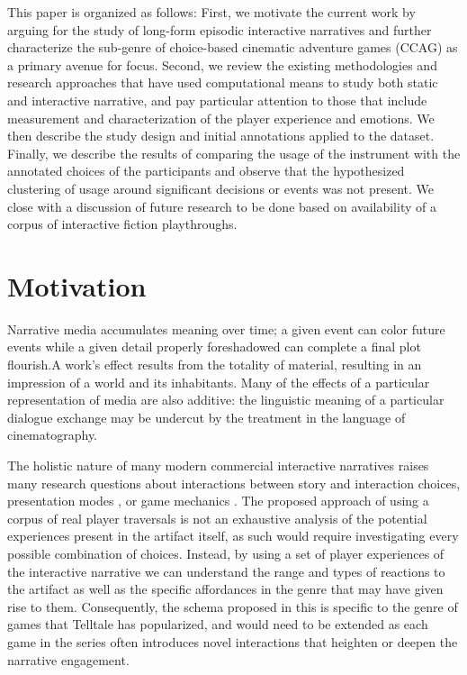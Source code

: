 This paper is organized as follows: First, we motivate the current work by arguing for the study of long-form episodic interactive narratives and further characterize the sub-genre of choice-based cinematic adventure games (CCAG) as a primary avenue for focus. Second, we review the existing methodologies and research approaches that have used computational means to study both static and interactive narrative, and pay particular attention to those that include measurement and characterization of the player experience and emotions. We then describe the study design and initial annotations applied to the dataset. Finally, we describe the results of comparing the usage of the instrument with the annotated choices of the participants and observe that the hypothesized clustering of usage around significant decisions or events was not present. We close with a discussion of future research to be done based on availability of a corpus of interactive fiction playthroughs.
\section{Motivation}
\label{sec:orgheadline2}
Narrative media accumulates meaning over time; a given event can color future events while a given detail properly foreshadowed can complete a final plot flourish.A work’s effect results from the totality of material, resulting in an impression of a world and its inhabitants. Many of the effects of a particular representation of media are also additive: the linguistic meaning of a particular dialogue exchange may be undercut by the treatment in the language of cinematography.

The holistic nature of many modern commercial interactive narratives raises many research questions about interactions between story and interaction choices, presentation modes \cite{Springel1998-gm}, or game mechanics \cite{Larsen2016-sk}. The proposed approach of using a corpus of real player traversals is not an exhaustive analysis of the potential experiences present in the artifact itself, as such would require investigating every possible combination of choices. Instead, by using a set of player experiences of the interactive narrative we can understand the range and types of reactions to the artifact as well as the specific affordances in the genre that may have given rise to them. Consequently, the schema proposed in this is specific to the genre of games that Telltale has popularized, and would need to be extended as each game in the series often introduces novel interactions that heighten or deepen the narrative engagement.

